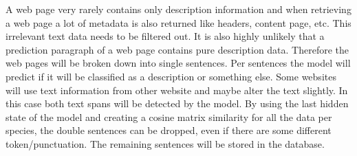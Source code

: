 \documentclass{article}
\begin{document}
A web page very rarely contains only description information and when retrieving a web page a lot of metadata is also returned like headers, content page, etc.
This irrelevant text data needs to be filtered out. 
It is also highly unlikely that a prediction paragraph of a web page contains pure description data.
Therefore the web pages will be broken down into single sentences.
Per sentences the model will predict if it will be classified as a description or something else.
Some websites will use text information from other website and maybe alter the text slightly. 
In this case both text spans will be detected by the model. 
By using the last hidden state of the model and creating a cosine matrix similarity for all the data per species, the double sentences can be dropped, even if there are some different token/punctuation.
The remaining sentences will be stored in the database.


\end{document}
